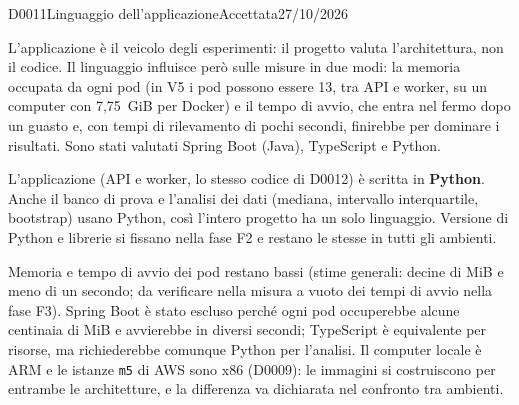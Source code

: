 \begin{decisione}{D0011}{Linguaggio dell'applicazione}{Accettata}{27/10/2026}

\contesto
L'applicazione è il veicolo degli esperimenti: il progetto valuta l'architettura, non il codice. Il linguaggio influisce però sulle misure in due modi: la memoria occupata da ogni pod (in V5 i pod possono essere 13, tra API e worker, su un computer con 7,75~GiB per Docker) e il tempo di avvio, che entra nel fermo dopo un guasto e, con tempi di rilevamento di pochi secondi, finirebbe per dominare i risultati. Sono stati valutati Spring Boot (Java), TypeScript e Python.

\scelta
L'applicazione (API e worker, lo stesso codice di D0012) è scritta in \textbf{Python}. Anche il banco di prova e l'analisi dei dati (mediana, intervallo interquartile, bootstrap) usano Python, così l'intero progetto ha un solo linguaggio. Versione di Python e librerie si fissano nella fase F2 e restano le stesse in tutti gli ambienti.

\conseguenze
Memoria e tempo di avvio dei pod restano bassi (stime generali: decine di MiB e meno di un secondo; da verificare nella misura a vuoto dei tempi di avvio nella fase F3). Spring Boot è stato escluso perché ogni pod occuperebbe alcune centinaia di MiB e avvierebbe in diversi secondi; TypeScript è equivalente per risorse, ma richiederebbe comunque Python per l'analisi. Il computer locale è ARM e le istanze \texttt{m5} di AWS sono x86 (D0009): le immagini si costruiscono per entrambe le architetture, e la differenza va dichiarata nel confronto tra ambienti.

\end{decisione}
